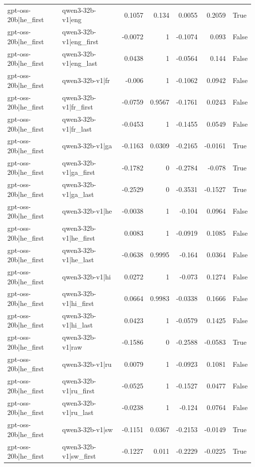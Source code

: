 \begin{table}
\begin{tabular}{l l r r r r l}
gpt-oss-20b|he_first & qwen3-32b-v1|eng & 0.1057 & 0.134 & 0.0055 & 0.2059 & True \\
gpt-oss-20b|he_first & qwen3-32b-v1|eng_first & -0.0072 & 1 & -0.1074 & 0.093 & False \\
gpt-oss-20b|he_first & qwen3-32b-v1|eng_last & 0.0438 & 1 & -0.0564 & 0.144 & False \\
gpt-oss-20b|he_first & qwen3-32b-v1|fr & -0.006 & 1 & -0.1062 & 0.0942 & False \\
gpt-oss-20b|he_first & qwen3-32b-v1|fr_first & -0.0759 & 0.9567 & -0.1761 & 0.0243 & False \\
gpt-oss-20b|he_first & qwen3-32b-v1|fr_last & -0.0453 & 1 & -0.1455 & 0.0549 & False \\
gpt-oss-20b|he_first & qwen3-32b-v1|ga & -0.1163 & 0.0309 & -0.2165 & -0.0161 & True \\
gpt-oss-20b|he_first & qwen3-32b-v1|ga_first & -0.1782 & 0 & -0.2784 & -0.078 & True \\
gpt-oss-20b|he_first & qwen3-32b-v1|ga_last & -0.2529 & 0 & -0.3531 & -0.1527 & True \\
gpt-oss-20b|he_first & qwen3-32b-v1|he & -0.0038 & 1 & -0.104 & 0.0964 & False \\
gpt-oss-20b|he_first & qwen3-32b-v1|he_first & 0.0083 & 1 & -0.0919 & 0.1085 & False \\
gpt-oss-20b|he_first & qwen3-32b-v1|he_last & -0.0638 & 0.9995 & -0.164 & 0.0364 & False \\
gpt-oss-20b|he_first & qwen3-32b-v1|hi & 0.0272 & 1 & -0.073 & 0.1274 & False \\
gpt-oss-20b|he_first & qwen3-32b-v1|hi_first & 0.0664 & 0.9983 & -0.0338 & 0.1666 & False \\
gpt-oss-20b|he_first & qwen3-32b-v1|hi_last & 0.0423 & 1 & -0.0579 & 0.1425 & False \\
gpt-oss-20b|he_first & qwen3-32b-v1|raw & -0.1586 & 0 & -0.2588 & -0.0583 & True \\
gpt-oss-20b|he_first & qwen3-32b-v1|ru & 0.0079 & 1 & -0.0923 & 0.1081 & False \\
gpt-oss-20b|he_first & qwen3-32b-v1|ru_first & -0.0525 & 1 & -0.1527 & 0.0477 & False \\
gpt-oss-20b|he_first & qwen3-32b-v1|ru_last & -0.0238 & 1 & -0.124 & 0.0764 & False \\
gpt-oss-20b|he_first & qwen3-32b-v1|sw & -0.1151 & 0.0367 & -0.2153 & -0.0149 & True \\
gpt-oss-20b|he_first & qwen3-32b-v1|sw_first & -0.1227 & 0.011 & -0.2229 & -0.0225 & True \\

\end{tabular}
\end{table}
